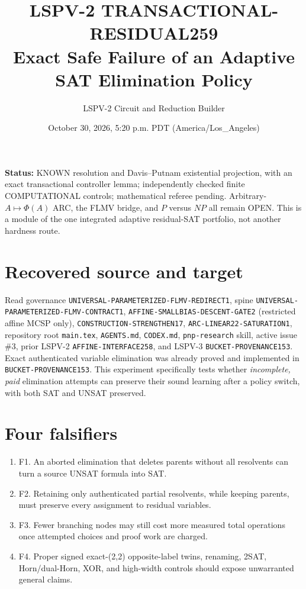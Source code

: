 \documentclass[11pt]{article}
\title{LSPV-2 TRANSACTIONAL-RESIDUAL259\\Exact Safe Failure of an Adaptive SAT Elimination Policy}
\author{LSPV-2 Circuit and Reduction Builder}
\date{October 30, 2026, 5:20 p.m. PDT (America/Los\_Angeles)}
\begin{document}
\maketitle
\noindent\textbf{Status:} KNOWN resolution and Davis--Putnam existential projection, with an exact transactional controller lemma; independently checked finite COMPUTATIONAL controls; mathematical referee pending. Arbitrary-$A\mapsto\Phi(A)$ ARC, the FLMV bridge, and $P$ versus $NP$ all remain OPEN. This is a module of the one integrated adaptive residual-SAT portfolio, not another hardness route.

\section{Recovered source and target}
Read governance \texttt{UNIVERSAL-PARAMETERIZED-FLMV-REDIRECT1}, spine \texttt{UNIVERSAL-PARAMETERIZED-FLMV-CONTRACT1}, \texttt{AFFINE-SMALLBIAS-DESCENT-GATE2} (restricted affine MCSP only), \texttt{CONSTRUCTION-STRENGTHEN17}, \texttt{ARC-LINEAR22-SATURATION1}, repository root \texttt{main.tex}, \texttt{AGENTS.md}, \texttt{CODEX.md}, \texttt{pnp-research} skill, active issue \#3, prior LSPV-2 \texttt{AFFINE-INTERFACE258}, and LSPV-3 \texttt{BUCKET-PROVENANCE153}. Exact authenticated variable elimination was already proved and implemented in \texttt{BUCKET-PROVENANCE153}. This experiment specifically tests whether \emph{incomplete, paid} elimination attempts can preserve their sound learning after a policy switch, with both SAT and UNSAT preserved.

\section{Four falsifiers}
\begin{enumerate}
\item[] F1. An aborted elimination that deletes parents without all resolvents can turn a source UNSAT formula into SAT.
\item[] F2. Retaining only authenticated partial resolvents, while keeping parents, must preserve every assignment to residual variables.
\item[] F3. Fewer branching nodes may still cost more measured total operations once attempted choices and proof work are charged.
\item[] F4. Proper signed exact-(2,2) opposite-label twins, renaming, 2SAT, Horn/dual-Horn, XOR, and high-width controls should expose unwarranted general claims.
\end{enumerate}
\end{document}
